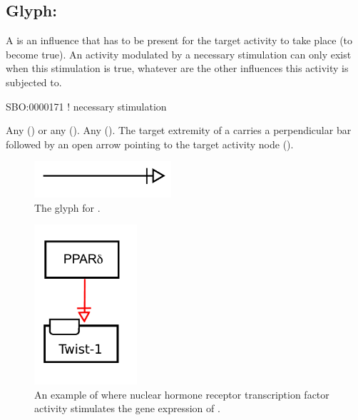 \subsection{Glyph: }
\label{sec:af:trigger}
A  is an influence that has to be present for the target activity to take place (to become true).  An activity modulated by a necessary stimulation can only exist when this stimulation is true, whatever are the other influences this activity is subjected to.

\begin{glyphDescription}

\glyphSboTerm SBO:0000171 ! necessary stimulation

 \glyphOrigin Any  () or any  ().
 \glyphTarget Any  ().
 \glyphEndPoint The target extremity of a  carries a perpendicular bar followed by an open arrow pointing to the target activity node ().


\end{glyphDescription}

\begin{figure}[H]
  \centering
  \includegraphics[width = 2in]{images/necessaryStimulation}
  \caption{The \AF glyph for .}
  \label{fig:af:trigger}
\end{figure}

\begin{figure}[H]
  \centering
  \includegraphics[width = 1.5in]{examples/ex-necessaryStimulation}
  \caption{An example of  where nuclear hormone receptor  transcription factor activity stimulates the gene expression of . }
  \label{fig:af:ex-NS}
\end{figure}
